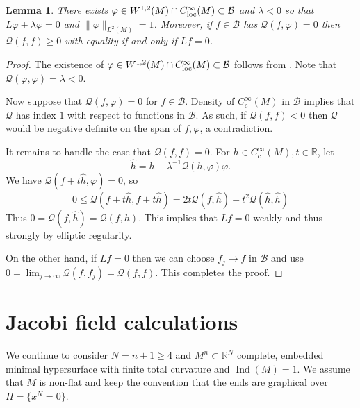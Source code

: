 \documentclass[11pt]{amsart}
\numberwithin{equation}{section}
\theoremstyle{plain}
\newtheorem{lemma}[lemma]{Lemma}
\theoremstyle{definition}
\theoremstyle{remark}
\newcommand{\R}{\mathbb{R}}
\DeclareMathOperator{\Ind}{Ind}
\newcommand{\Qcal}{\mathcal Q}
\newcommand{\Bcal}{\mathcal B}
\begin{document}
\begin{lemma}\label{lemm:index-eig}
There exists $\varphi \in W^{1,2}(M) \cap C^\infty_\textnormal{loc}(M) \subset \Bcal$ and $\lambda<0$ so that $L\varphi + \lambda \varphi = 0$ and $\|\varphi\|_{L^2(M)} = 1$. Moreover, if $f \in \Bcal$ has $\Qcal(f,\varphi) = 0$ then $\Qcal(f,f) \geq 0$ with equality if and only if $Lf =0$.
\end{lemma}
\begin{proof}
The existence of $\varphi \in W^{1,2}(M) \cap C^\infty_\textnormal{loc}(M) \subset \Bcal$ follows from \cite[Proposition 2.5]{Li2017}. Note that $\Qcal(\varphi,\varphi) = \lambda < 0$. 


Now suppose that $\Qcal(f,\varphi) = 0$ for $f\in \Bcal$. Density of $C^\infty_c(M)$ in $\Bcal$ implies that $\Qcal$ has index $1$ with respect to functions in $\Bcal$. As such, if $\Qcal(f,f) < 0$ then $\Qcal$ would be negative definite on the span of $f,\varphi$, a contradiction. 

It remains to handle the case that $\Qcal(f,f) = 0$. For $h \in C^\infty_c(M),t\in\R$, let 
\[
\hat h = h -   \lambda^{-1} \Qcal(h,\varphi)\varphi.
\]
We have $\Qcal(f + t\hat h,\varphi) = 0$, so 
\[
0 \leq \Qcal(f+t\hat h,f+t\hat h) = 2t \Qcal(f,\hat h) + t^2 \Qcal(\hat h,\hat h)
\]
Thus $0 = \Qcal(f,\hat h) = \Qcal(f,h)$. This implies that $L f=0$ weakly and thus strongly by elliptic regularity. 

On the other hand, if $Lf = 0$ then we can choose $f_j \to f$ in $\Bcal$ and use $0 = \lim_{j\to\infty} \Qcal(f,f_j) = \Qcal(f,f)$. This completes the proof. 
\end{proof}



\section{Jacobi field calculations}\label{sec:jac} 

We continue to consider $N = n+1\geq 4$ and $M^n\subset \R^N$ complete, embedded minimal hypersurface with finite total curvature and $\Ind(M) = 1$. We assume that $M$ is non-flat and keep the convention that the ends are graphical over $\Pi = \{x^N = 0\}$. 
\end{document}
